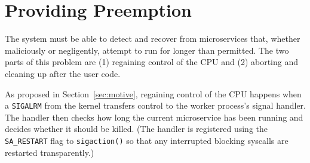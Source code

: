 \section{Providing Preemption}
\label{sec:preemption}

% 
% 



The system must be able to detect and recover from microservices that, whether
maliciously or negligently, attempt to run for longer than permitted.  The two parts
of this problem are (1) regaining control of the CPU and (2) aborting and cleaning up
after the user code.

As proposed in Section~\ref{sec:motive}, regaining control of the CPU happens when a
\texttt{SIGALRM} from the kernel transfers control to the worker process's signal
handler.  The handler then checks how long the current microservice has been running
and decides whether it should be killed.  (The handler is registered using the
\texttt{SA\_RESTART} flag to \texttt{sigaction()} so that any interrupted blocking
syscalls are restarted transparently.)

